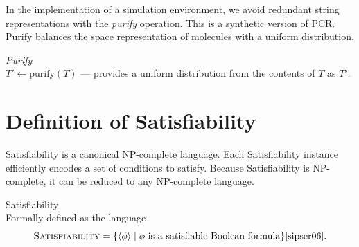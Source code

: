 In the implementation of a simulation environment, we avoid redundant string representations with the \textit{purify} operation.  This is a synthetic version of PCR.  Purify balances the space representation of molecules with a uniform distribution.
\begin{definition}
\textit{Purify}\\
$T' \leftarrow \text{purify}(T)$ --- provides a uniform distribution from the contents of $T$ as $T'$.
\end{definition}


	
\section{Definition of {\sc Satisfiability}}

	
{\sc Satisfiability} is a canonical \textsf{NP-complete} language.  Each {\sc Satisfiability} instance efficiently encodes a set of conditions to satisfy.  Because {\sc Satisfiability} is \textsf{NP-complete}, it can be reduced to any \textsf{NP-complete} language.

\begin{definition}
{\sc Satisfiability}\\
Formally defined as the language
\[
\text{\sc Satisfiability} = \{ \langle \phi \rangle \mid \phi \text{ is a satisfiable Boolean formula}\} \cite{sipser06}.
\]	
\end{definition}


